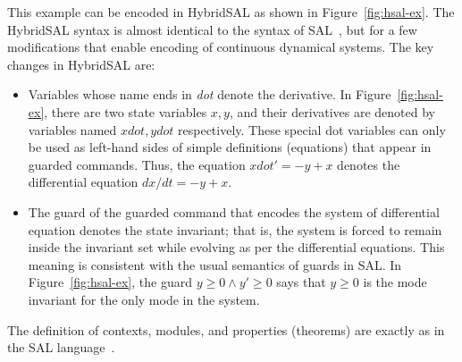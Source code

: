 \documentclass{article}
\begin{document}
This example can be encoded in HybridSAL as shown in
Figure~\ref{fig:hsal-ex}.  The HybridSAL syntax is 
almost identical to the syntax of SAL~\cite{SAL-language}, but for a few
modifications that enable encoding of continuous dynamical
systems. The key changes in HybridSAL are:
\begin{itemize}
\item
Variables whose name ends in {\em{dot}} denote the derivative.
In Figure~\ref{fig:hsal-ex}, there are two state variables
$x,y$, and their derivatives are denoted by variables named
$xdot,ydot$ respectively.  These special dot variables can only
be used as left-hand sides of simple definitions (equations)
that appear in guarded commands.  Thus, the equation
$xdot' = -y+x$ denotes the differential equation
$dx/dt = -y+x$.
\item
The guard of the guarded command that encodes the system of
differential equation denotes the state invariant; that is,
the system is forced to remain inside the invariant set while
evolving as per the differential equations.
This meaning is consistent with the usual semantics of guards
in SAL. 
In Figure~\ref{fig:hsal-ex}, the guard $y \geq 0\wedge y'\geq 0$
says that $y\geq 0$ is the mode invariant for the only
mode in the system.
\end{itemize}
The definition of contexts, modules, and properties (theorems)
are exactly as in the SAL language~\cite{SAL-language}.
\end{document}

